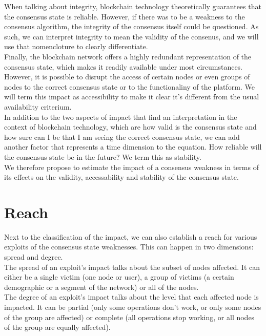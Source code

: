 \documentclass[11pt,a4paper,draft]{article}
\begin{document}
When talking about integrity, blockchain technology theoretically guarantees that the consensus state is reliable. However, if there was to be a weakness to the consensus algorithm, the integrity of the consensus itself could be questioned. As such, we can interpret integrity to mean the validity of the consenus, and we will use that nomencloture to clearly differentiate.\\

Finally, the blockchain network offers a highly redundant representation of the consensus state, which makes it readily available under most circumstances. However, it is possible to disrupt the access of certain nodes or even groups of nodes to the correct consensus state or to the functionaliny of the platform. We will term this impact as accessibility to make it clear it's different from the usual availability criterium.\\

In addition to the two aspects of impact that find an interpretation in the context of blockchain technology, which are how valid is the consensus state and how sure can I be that I am seeing the correct consensus state, we can add another factor that represents a time dimension to the equation. How reliable will the consensus state be in the future? We term this as stability.\\

We therefore propose to estimate the impact of a consensus weakness in terms of its effects on the validity, accessability and stability of the consensus state.\\

\section{Reach}

Next to the classification of the impact, we can also establish a reach for various exploits of the consensus state weaknesses. This can happen in two dimensions: spread and degree.\\

The spread of an exploit's impact talks about the subset of nodes affected. It can either be a single victim (one node or user), a group of victims (a certain demographic or a segment of the network) or all of the nodes.\\

The degree of an exploit's impact talks about the level that each affected node is impacted. It can be partial (only some operations don't work, or only some nodes of the group are affected) or complete (all operations stop working, or all nodes of the group are equally affected).\\
\end{document}
